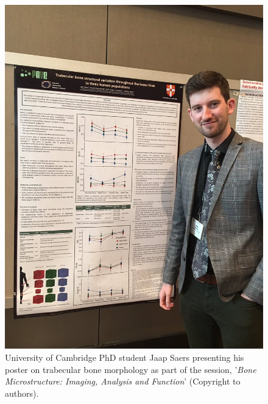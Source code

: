 \documentclass[english]{ijsra}
\begin{document}
	\begin{figure} %
		\includegraphics[width=\linewidth]{figures/Ward-Figure6}
		\caption{University of Cambridge PhD student Jaap Saers presenting his poster on trabecular bone morphology as part of the session, '\emph{Bone Microstructure: Imaging, Analysis and Function}' (Copyright to authors).}
		\centering
		\label{fig:Ward-Figure6}
	\end{figure}
\end{document}
